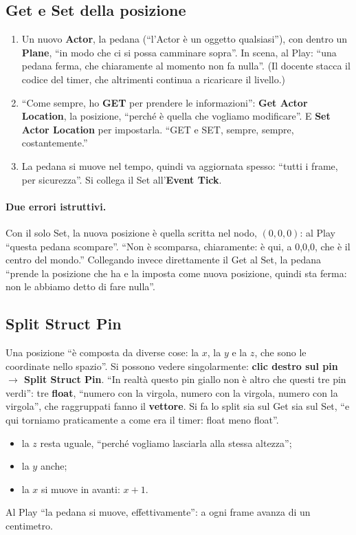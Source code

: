 \subsection{Get e Set della posizione}

\begin{enumerate}
  \item Un nuovo \textbf{Actor}, la pedana (``l'Actor è un oggetto qualsiasi''),
        con dentro un \textbf{Plane}, ``in modo che ci si possa camminare
        sopra''. In scena, al Play: ``una pedana ferma, che chiaramente al
        momento non fa nulla''. (Il docente stacca il codice del timer, che
        altrimenti continua a ricaricare il livello.)
  \item ``Come sempre, ho \textbf{GET} per prendere le informazioni'':
        \textbf{Get Actor Location}, la posizione, ``perché è quella che vogliamo
        modificare''. E \textbf{Set Actor Location} per impostarla. ``GET e SET,
        sempre, sempre, costantemente.''
  \item La pedana si muove nel tempo, quindi va aggiornata spesso: ``tutti i
        frame, per sicurezza''. Si collega il Set all'\textbf{Event Tick}.
\end{enumerate}

\paragraph{Due errori istruttivi.} Con il solo Set, la nuova posizione è quella
scritta nel nodo, $(0, 0, 0)$: al Play ``questa pedana scompare''. ``Non è
scomparsa, chiaramente: è qui, a 0,0,0, che è il centro del mondo.'' Collegando
invece direttamente il Get al Set, la pedana ``prende la posizione che ha e la
imposta come nuova posizione, quindi sta ferma: non le abbiamo detto di fare
nulla''.

\subsection{Split Struct Pin}

Una posizione ``è composta da diverse cose: la $x$, la $y$ e la $z$, che sono le
coordinate nello spazio''. Si possono vedere singolarmente: \textbf{clic destro
sul pin $\rightarrow$ Split Struct Pin}. ``In realtà questo pin giallo non è
altro che questi tre pin verdi'': tre \textbf{float}, ``numero con la virgola,
numero con la virgola, numero con la virgola'', che raggruppati fanno il
\textbf{vettore}. Si fa lo split sia sul Get sia sul Set, ``e qui torniamo
praticamente a come era il timer: float meno float''.
\begin{itemize}
  \item la $z$ resta uguale, ``perché vogliamo lasciarla alla stessa altezza'';
  \item la $y$ anche;
  \item la $x$ si muove in avanti: $x + 1$.
\end{itemize}
Al Play ``la pedana si muove, effettivamente'': a ogni frame avanza di un
centimetro.

